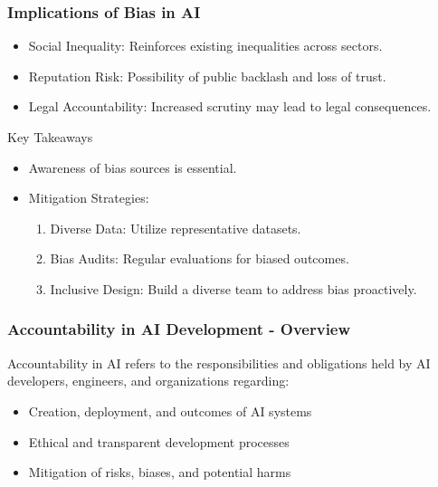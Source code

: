 \documentclass{beamer}
\begin{document}
\begin{frame}[fragile]
    \frametitle{Implications of Bias in AI}
    \begin{itemize}
        \item Social Inequality: Reinforces existing inequalities across sectors.
        \item Reputation Risk: Possibility of public backlash and loss of trust.
        \item Legal Accountability: Increased scrutiny may lead to legal consequences.
    \end{itemize}
    
    \begin{block}{Key Takeaways}
        \begin{itemize}
            \item Awareness of bias sources is essential.
            \item Mitigation Strategies:
                \begin{enumerate}
                    \item Diverse Data: Utilize representative datasets.
                    \item Bias Audits: Regular evaluations for biased outcomes.
                    \item Inclusive Design: Build a diverse team to address bias proactively.
                \end{enumerate}
        \end{itemize}
    \end{block}
\end{frame}

\begin{frame}[fragile]
    \frametitle{Accountability in AI Development - Overview}
    Accountability in AI refers to the responsibilities and obligations held by AI developers, engineers, and organizations regarding:
    \begin{itemize}
        \item Creation, deployment, and outcomes of AI systems
        \item Ethical and transparent development processes
        \item Mitigation of risks, biases, and potential harms
    \end{itemize}
\end{frame}
\end{document}

